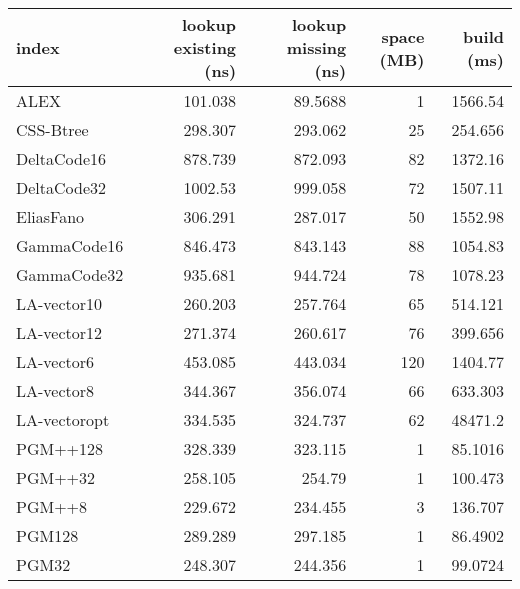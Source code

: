 \begin{tabular}{lrrrr}
\hline
 index             &   lookup existing (ns) &   lookup missing (ns) &   space (MB) &      build (ms) \\
\hline
 ALEX              &               101.038  &               89.5688 &            1 &  1566.54        \\
 CSS-Btree         &               298.307  &              293.062  &           25 &   254.656       \\
 DeltaCode16       &               878.739  &              872.093  &           82 &  1372.16        \\
 DeltaCode32       &              1002.53   &              999.058  &           72 &  1507.11        \\
 EliasFano         &               306.291  &              287.017  &           50 &  1552.98        \\
 GammaCode16       &               846.473  &              843.143  &           88 &  1054.83        \\
 GammaCode32       &               935.681  &              944.724  &           78 &  1078.23        \\
 LA-vector10       &               260.203  &              257.764  &           65 &   514.121       \\
 LA-vector12       &               271.374  &              260.617  &           76 &   399.656       \\
 LA-vector6        &               453.085  &              443.034  &          120 &  1404.77        \\
 LA-vector8        &               344.367  &              356.074  &           66 &   633.303       \\
 LA-vectoropt      &               334.535  &              324.737  &           62 & 48471.2         \\
 PGM++128          &               328.339  &              323.115  &            1 &    85.1016      \\
 PGM++32           &               258.105  &              254.79   &            1 &   100.473       \\
 PGM++8            &               229.672  &              234.455  &            3 &   136.707       \\
 PGM128            &               289.289  &              297.185  &            1 &    86.4902      \\
 PGM32             &               248.307  &              244.356  &            1 &    99.0724      \\

\end{tabular}
